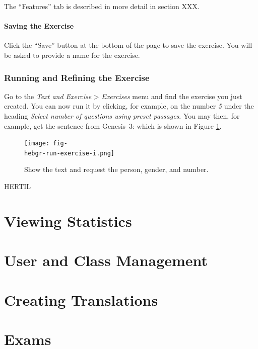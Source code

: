 \documentclass[11pt,oneside,a4paper]{memoir}
\newcommand*{\bibleref}[3]{#1~#2\thinspace:\thinspace#3}
\newcommand{\hebgr}{}   %
\begin{document}
{The ``Features'' tab is described in more detail in section XXX.

\subsubsection{Saving the Exercise}

Click the ``Save'' button at the bottom of the page to save the exercise. You will be asked to
provide a name for the exercise.

\subsection{Running and Refining the Exercise}

Go to the \emph{Text and Exercise} > \emph{Exercises} menu and find the exercise you just created.
You can now run it by clicking, for example, on the number \emph{5} under the heading \emph{Select
  number of questions using preset passages}. You may then, for example, get the sentence from
\bibleref{Genesis}{3}{1} which is shown in Figure \ref{fig-\hebgr-run-exercise-i}.

\begin{figure}
  \begin{center}
    \texttt{[image: fig-\\hebgr-run-exercise-i.png]}
  \end{center}
  \caption{Show the text and request the person, gender, and number.}\label{fig-\hebgr-run-exercise-i}
\end{figure}

HERTIL

}




\FloatBlock
{}

\FloatBlock




\chapter{Viewing Statistics}
\chapter{User and Class Management}
\chapter{Creating Translations}
\chapter{Exams}
\end{document}
